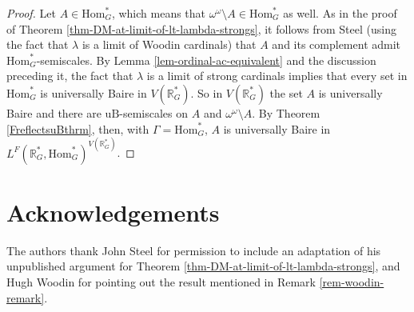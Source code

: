 \documentclass[fleqn, 11pt]{amsart}
\theoremstyle{plain}
\theoremstyle{definition}
\theoremstyle{remark}
\newcommand{\Hom}{\mathrm{Hom}}
\newcommand{\uB}{\mathrm{uB}}
\begin{document}
\begin{proof}
Let $A\in \Hom^*_G$, which means that $\omega^\omega \setminus A \in \Hom^*_G$ as well.
As in the proof of Theorem \ref{thm-DM-at-limit-of-lt-lambda-strongs},
it follows from Steel \cite[Theorem~5.3]{SteDMT} (using the fact that $\lambda$ is a limit of Woodin cardinals) that $A$ and its complement admit $\Hom^*_G$-semiscales.
By Lemma \ref{lem-ordinal-ac-equivalent} and the discussion preceding it, the fact that $\lambda$ is a limit of strong cardinals implies that every set in $\Hom^*_G$ is universally Baire in $V(\mathbb{R}^*_G)$.
So in $V(\mathbb{R}^*_G)$ the set $A$ is universally Baire and there are $\uB$-semiscales on $A$ and $\omega^\omega \setminus A$. By Theorem \ref{FreflectsuBthrm}, then, with $\Gamma = \Hom^{*}_{G}$, $A$ is universally Baire in $L^F(\mathbb{R}^*_G, \Hom^*_G)^{V(\mathbb{R}^*_G)}$. 
\end{proof}







\section*{Acknowledgements}
The authors thank John Steel for permission to include
an adaptation of his unpublished argument for Theorem \ref{thm-DM-at-limit-of-lt-lambda-strongs}, and Hugh Woodin for pointing out the result mentioned in Remark \ref{rem-woodin-remark}.





{}

\end{document}
